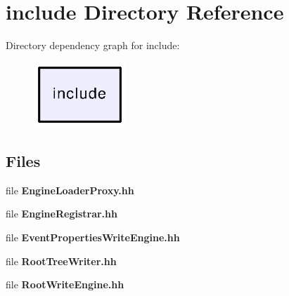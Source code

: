 \section{include Directory Reference}
\label{dir_d44c64559bbebec7f509842c48db8b23}
Directory dependency graph for include\-:
\nopagebreak
\begin{figure}[H]
\begin{center}
\leavevmode
\includegraphics[width=98pt]{dir_d44c64559bbebec7f509842c48db8b23_dep}
\end{center}
\end{figure}
\subsection*{Files}
\begin{DoxyCompactItemize}
\item 
file {\bfseries Engine\-Loader\-Proxy.\-hh}
\item 
file {\bfseries Engine\-Registrar.\-hh}
\item 
file {\bfseries Event\-Properties\-Write\-Engine.\-hh}
\item 
file {\bfseries Root\-Tree\-Writer.\-hh}
\item 
file {\bfseries Root\-Write\-Engine.\-hh}
\end{DoxyCompactItemize}
